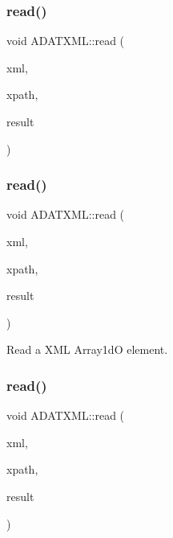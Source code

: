 \mbox{\label{group__io_ga8feeff4a74f8b53707756dc206808983}} 
\subsubsection{\texorpdfstring{read()}{read()}\hspace{0.1cm}{\footnotesize\ttfamily [41/52]}}
{\footnotesize\ttfamily void A\+D\+A\+T\+X\+M\+L\+::read (\begin{DoxyParamCaption}\item[{\mbox{\hyperlink{classADATXML_1_1XMLReader}{X\+M\+L\+Reader}} \&}]{xml,  }\item[{const std\+::string \&}]{xpath,  }\item[{std\+::list$<$ double $>$ \&}]{result }\end{DoxyParamCaption})}

\mbox{\label{group__io_ga1f304041cae2cc81ec6bd79e94a0f7dd}} 
\subsubsection{\texorpdfstring{read()}{read()}\hspace{0.1cm}{\footnotesize\ttfamily [42/52]}}
{\footnotesize\ttfamily void A\+D\+A\+T\+X\+M\+L\+::read (\begin{DoxyParamCaption}\item[{\mbox{\hyperlink{classADATXML_1_1XMLReader}{X\+M\+L\+Reader}} \&}]{xml,  }\item[{const std\+::string \&}]{xpath,  }\item[{\mbox{\hyperlink{classADAT_1_1Array1dO}{A\+D\+A\+T\+::\+Array1dO}}$<$ int $>$ \&}]{result }\end{DoxyParamCaption})}



Read a X\+ML Array1dO element. 

\mbox{\label{group__io_ga1c554d7ca96ef05f2e5c8d92af1515b9}} 
\subsubsection{\texorpdfstring{read()}{read()}\hspace{0.1cm}{\footnotesize\ttfamily [43/52]}}
{\footnotesize\ttfamily void A\+D\+A\+T\+X\+M\+L\+::read (\begin{DoxyParamCaption}\item[{\mbox{\hyperlink{classADATXML_1_1XMLReader}{X\+M\+L\+Reader}} \&}]{xml,  }\item[{const std\+::string \&}]{xpath,  }\item[{\mbox{\hyperlink{classADAT_1_1Array1dO}{A\+D\+A\+T\+::\+Array1dO}}$<$ unsigned int $>$ \&}]{result }\end{DoxyParamCaption})}

